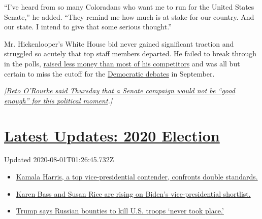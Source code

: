 ``I've heard from so many Coloradans who want me to run for the United
States Senate,'' he added. ``They remind me how much is at stake for our
country. And our state. I intend to give that some serious thought.''

Mr. Hickenlooper's White House bid never gained significant traction and
struggled so acutely that top staff members departed. He failed to break
through in the polls,
\href{https://www.nytimes.com/interactive/2019/07/16/us/politics/democratic-fundraising-2020.html}{raised
less money than most of his competitors} and was all but certain to miss
the cutoff for the
\href{https://www.nytimes.com/news-event/democratic-debates}{Democratic
debates} in September.

\emph{{[}}\href{https://www.nytimes.com/2019/08/15/us/politics/beto-orourke-2020-trump.html}{\emph{Beto
O'Rourke said Thursday that a Senate campaign would not be ``good
enough'' for this political moment}}\emph{.{]}}

\hypertarget{latest-updates-2020-election}{%
\section{\texorpdfstring{\href{https://www.nytimes.com/2020/07/31/us/elections/biden-vs-trump.html?action=click\&pgtype=Article\&state=default\&region=MAIN_CONTENT_1\&context=storylines_live_updates}{Latest
Updates: 2020
Election}}{Latest Updates: 2020 Election}}\label{latest-updates-2020-election}}

Updated 2020-08-01T01:26:45.732Z

\begin{itemize}
\tightlist
\item
  \href{https://www.nytimes.com/2020/07/31/us/elections/biden-vs-trump.html?action=click\&pgtype=Article\&state=default\&region=MAIN_CONTENT_1\&context=storylines_live_updates\#link-29fdff45}{Kamala
  Harris, a top vice-presidential contender, confronts double
  standards.}
\item
  \href{https://www.nytimes.com/2020/07/31/us/elections/biden-vs-trump.html?action=click\&pgtype=Article\&state=default\&region=MAIN_CONTENT_1\&context=storylines_live_updates\#link-13ec3d9c}{Karen
  Bass and Susan Rice are rising on Biden's vice-presidential
  shortlist.}
\item
  \href{https://www.nytimes.com/2020/07/31/us/elections/biden-vs-trump.html?action=click\&pgtype=Article\&state=default\&region=MAIN_CONTENT_1\&context=storylines_live_updates\#link-49e9a016}{Trump
  says Russian bounties to kill U.S. troops `never took place.'}
\end{itemize}

